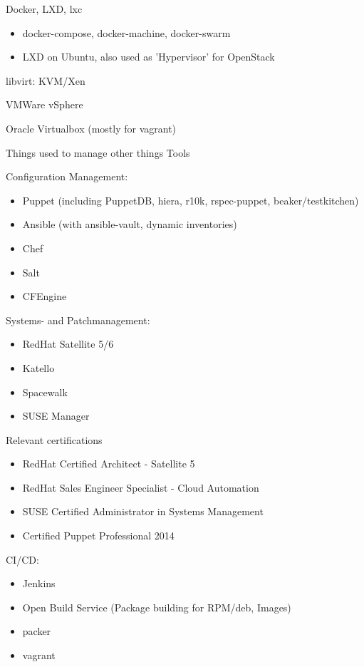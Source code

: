 \begin{cventries}
{\begin{cvitems}
        \item Docker, LXD, lxc
          \begin{itemize}
            \item docker-compose, docker-machine, docker-swarm
            \item LXD on Ubuntu, also used as 'Hypervisor' for OpenStack
          \end{itemize}
        \item libvirt: KVM/Xen
        \item VMWare vSphere
        \item Oracle Virtualbox (mostly for vagrant)
      \end{cvitems}
    }
  \cventry
    {Things used to manage other things}
    {Tools}
    {}
    {}
    {
      \begin{cvitems}
        \item Configuration Management:
          \begin{itemize}
            \item Puppet (including PuppetDB, hiera, r10k, rspec-puppet, beaker/testkitchen)
            \item Ansible (with ansible-vault, dynamic inventories)
            \item Chef
            \item Salt
            \item CFEngine
          \end{itemize}
        \item Systems- and Patchmanagement:
        \begin{itemize}
          \item RedHat Satellite 5/6
          \item Katello
          \item Spacewalk
          \item SUSE Manager
        \end{itemize}
        \item Relevant certifications
          \begin{itemize}
            \item RedHat Certified Architect - Satellite 5
            \item RedHat Sales Engineer Specialist - Cloud Automation
            \item SUSE Certified Administrator in Systems Management
            \item Certified Puppet Professional 2014
          \end{itemize}
      \item CI/CD:
        \begin{itemize}
          \item Jenkins
          \item Open Build Service (Package building for RPM/deb, Images)
          \item packer
          \item vagrant
        \end{itemize}
      \end{cvitems}
    }


\end{cventries}
